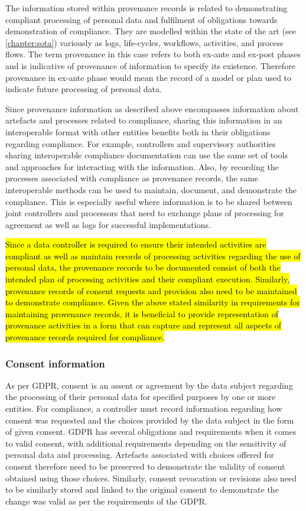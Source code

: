 The information stored within provenance records is related to demonstrating compliant processing of personal data and fulfilment of obligations towards demonstration of compliance. They are modelled within the state of the art (see \autoref{chapter:sota}) variously as logs, life-cycles, workflows, activities, and process flows. The term provenance in this case refers to both ex-ante and ex-post phases and is indicative of provenance of information to specify its existence. Therefore provenance in ex-ante phase would mean the record of a model or plan used to indicate future processing of personal data.

Since provenance information as described above encompasses information about artefacts and processes related to compliance, sharing this information in an interoperable format with other entities benefits both in their obligations regarding compliance. For example, controllers  and supervisory authorities sharing interoperable compliance documentation can use the same set of tools and approaches for interacting with the information. Also, by recording the processes associated with compliance as provenance records, the same interoperable methods can be used to maintain, document, and demonstrate the compliance. This is especially useful where information is to be shared between joint controllers and processors that need to exchange plans of processing for agreement as well as logs for successful implementations.

\hl{Since a data controller is required to ensure their intended activities are compliant as well as maintain records of processing activities regarding the use of personal data, the provenance records to be documented consist of both the intended plan of processing activities and their compliant execution. Similarly, provenance records of consent requests and provision also need to be maintained to demonstrate compliance. Given the above stated similarity in requirements for maintaining provenance records, it is beneficial to provide representation of provenance activities in a form that can capture and represent all aspects of provenance records required for compliance.}

\subsubsection*{Consent information}
As per GDPR, consent is an assent or agreement by the data subject regarding the processing of their personal data for specified purposes by one or more entities. 
For compliance, a controller must record information regarding how consent was requested and the choices provided by the data subject in the form of given consent.
GDPR has several obligations and requirements when it comes to valid consent, with additional requirements depending on the sensitivity of personal data and processing. 
Artefacts associated with choices offered for consent therefore need to be preserved to demonstrate the validity of consent obtained using those choices.
Similarly, consent revocation or revisions also need to be similarly stored and linked to the original consent to demonstrate the change was valid as per the requirements of the GDPR.


